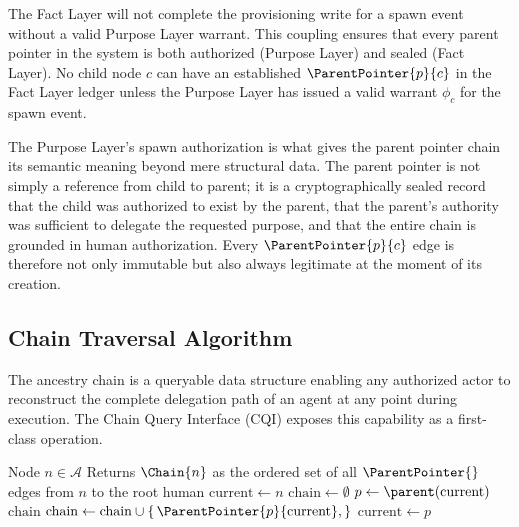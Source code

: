 The Fact Layer will not complete the provisioning write for a spawn event without a valid Purpose Layer warrant. This coupling ensures that every parent pointer in the system is both authorized (Purpose Layer) and sealed (Fact Layer). No child node $c$ can have an established $\ParentPointer{p}{c}$ in the Fact Layer ledger unless the Purpose Layer has issued a valid warrant $\phi_c$ for the spawn event.

The Purpose Layer's spawn authorization is what gives the parent pointer chain its semantic meaning beyond mere structural data. The parent pointer is not simply a reference from child to parent; it is a cryptographically sealed record that the child was authorized to exist by the parent, that the parent's authority was sufficient to delegate the requested purpose, and that the entire chain is grounded in human authorization. Every $\ParentPointer{p}{c}$ edge is therefore not only immutable but also always legitimate at the moment of its creation.

\subsection{Chain Traversal Algorithm}
\label{sec:chain_traversal}

The ancestry chain is a queryable data structure enabling any authorized actor to reconstruct the complete delegation path of an agent at any point during execution. The Chain Query Interface (CQI) exposes this capability as a first-class operation.

\begin{algorithm}[htbp]
\caption{Chain-Traverse($n$)}
\label{alg:chain_traverse}
\begin{algorithmic}[1]
\Require Node $n \in \mathcal{A}$
\Ensure Returns $\Chain{n}$ as the ordered set of all $\ParentPointer{}$ edges from $n$ to the root human
\State $\text{current} \gets n$
\State $\text{chain} \gets \emptyset$
\Loop
    \State $p \gets \parent(\text{current})$
        \State \Return $\text{chain}$ 
    \EndIf
    \State $\text{chain} \gets \text{chain} \cup \{\,\ParentPointer{p}{\text{current}},\}$
    \State $\text{current} \gets p$
\EndLoop
\end{algorithmic}
\end{algorithm}

